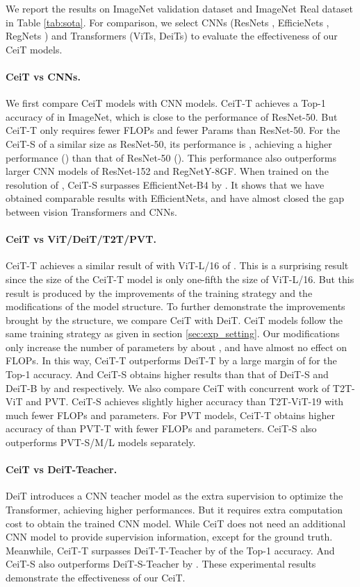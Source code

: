 \documentclass[10pt,twocolumn,letterpaper]{article}
\begin{document}
We report the results on ImageNet validation dataset and ImageNet Real dataset \cite{DBLP:journals/corr/abs-2006-07159} in Table \ref{tab:sota}. For comparison, we select CNNs (ResNets \cite{DBLP:conf/cvpr/HeZRS16}, EfficieNets \cite{DBLP:conf/icml/TanL19}, RegNets \cite{radosavovic2020designing}) and Transformers (ViTs, DeiTs) to evaluate the effectiveness of our CeiT models. 

\paragraph{CeiT vs CNNs.} We first compare CeiT models with CNN models. CeiT-T achieves a Top-1 accuracy of  in ImageNet, which is close to the performance of ResNet-50. But CeiT-T only requires  fewer FLOPs and  fewer Params than ResNet-50. For the CeiT-S of a similar size as ResNet-50, its performance is , achieving a higher performance () than that of ResNet-50 (). This performance also outperforms larger CNN models of ResNet-152 and RegNetY-8GF. When trained on the resolution of , CeiT-S surpasses EfficientNet-B4 by . It shows that we have obtained comparable results with EfficientNets, and have almost closed the gap between vision Transformers and CNNs.

\paragraph{CeiT vs ViT/DeiT/T2T/PVT.} 
CeiT-T achieves a similar result of  with ViT-L/16 of . This is a surprising result since the size of the CeiT-T model is only one-fifth the size of ViT-L/16. But this result is produced by the improvements of the training strategy and the modifications of the model structure. To further demonstrate the improvements brought by the structure, we compare CeiT with DeiT. CeiT models follow the same training strategy as given in section \ref{sec:exp_setting}. Our modifications only increase the number of parameters by about , and have almost no effect on FLOPs. In this way, CeiT-T outperforms DeiT-T by a large margin of  for the Top-1 accuracy. And CeiT-S obtains higher results than that of DeiT-S and DeiT-B by  and  respectively. 
We also compare CeiT with concurrent work of T2T-ViT and PVT.
CeiT-S achieves slightly higher accuracy than T2T-ViT-19 with much fewer FLOPs and parameters.
For PVT models, CeiT-T obtains higher accuracy of  than PVT-T with fewer FLOPs and parameters.
CeiT-S also outperforms PVT-S/M/L models separately.

\paragraph{CeiT vs DeiT-Teacher.} DeiT introduces a CNN teacher model as the extra supervision to optimize the Transformer, achieving higher performances. But it requires extra computation cost to obtain the trained CNN model. While CeiT does not need an additional CNN model to provide supervision information, except for the ground truth. Meanwhile, CeiT-T surpasses DeiT-T-Teacher by  of the Top-1 accuracy. And CeiT-S also outperforms DeiT-S-Teacher by . These experimental results demonstrate the effectiveness of our CeiT.
\end{document}
